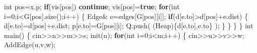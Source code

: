 \documentclass[
]{article}
\newenvironment{Shaded}{}{}
\newcommand{\ControlFlowTok}[1]{\textcolor[rgb]{0.00,0.44,0.13}{\textbf{#1}}}
\newcommand{\DataTypeTok}[1]{\textcolor[rgb]{0.56,0.13,0.00}{#1}}
\newcommand{\DecValTok}[1]{\textcolor[rgb]{0.25,0.63,0.44}{#1}}
\newcommand{\KeywordTok}[1]{\textcolor[rgb]{0.00,0.44,0.13}{\textbf{#1}}}
\newcommand{\NormalTok}[1]{#1}
\newcommand{\OperatorTok}[1]{\textcolor[rgb]{0.40,0.40,0.40}{#1}}
\begin{document}
\begin{Shaded}
\begin{Highlighting}[]
		\DataTypeTok{int}\NormalTok{ pos}\OperatorTok{=}\NormalTok{x}\OperatorTok{.}\NormalTok{p}\OperatorTok{;}
		\ControlFlowTok{if}\OperatorTok{(}\NormalTok{vis}\OperatorTok{[}\NormalTok{pos}\OperatorTok{])} \ControlFlowTok{continue}\OperatorTok{;}
\NormalTok{		vis}\OperatorTok{[}\NormalTok{pos}\OperatorTok{]=}\KeywordTok{true}\OperatorTok{;}
		\ControlFlowTok{for}\OperatorTok{(}\DataTypeTok{int}\NormalTok{ i}\OperatorTok{=}\DecValTok{0}\OperatorTok{;}\NormalTok{i}\OperatorTok{\textless{}}\NormalTok{G}\OperatorTok{[}\NormalTok{pos}\OperatorTok{].}\NormalTok{size}\OperatorTok{();}\NormalTok{i}\OperatorTok{++)} \OperatorTok{\{}
\NormalTok{			Edge}\OperatorTok{\&}\NormalTok{ e}\OperatorTok{=}\NormalTok{edges}\OperatorTok{[}\NormalTok{G}\OperatorTok{[}\NormalTok{pos}\OperatorTok{][}\NormalTok{i}\OperatorTok{]];}
			\ControlFlowTok{if}\OperatorTok{(}\NormalTok{d}\OperatorTok{[}\NormalTok{e}\OperatorTok{.}\NormalTok{to}\OperatorTok{]\textgreater{}}\NormalTok{d}\OperatorTok{[}\NormalTok{pos}\OperatorTok{]+}\NormalTok{e}\OperatorTok{.}\NormalTok{dist}\OperatorTok{)} \OperatorTok{\{}
\NormalTok{				d}\OperatorTok{[}\NormalTok{e}\OperatorTok{.}\NormalTok{to}\OperatorTok{]=}\NormalTok{d}\OperatorTok{[}\NormalTok{pos}\OperatorTok{]+}\NormalTok{e}\OperatorTok{.}\NormalTok{dist}\OperatorTok{;}
\NormalTok{				p}\OperatorTok{[}\NormalTok{e}\OperatorTok{.}\NormalTok{to}\OperatorTok{]=}\NormalTok{G}\OperatorTok{[}\NormalTok{pos}\OperatorTok{][}\NormalTok{i}\OperatorTok{];}
\NormalTok{				Q}\OperatorTok{.}\NormalTok{push}\OperatorTok{(} \OperatorTok{(}\NormalTok{Heap}\OperatorTok{)\{}\NormalTok{d}\OperatorTok{[}\NormalTok{e}\OperatorTok{.}\NormalTok{to}\OperatorTok{],}\NormalTok{e}\OperatorTok{.}\NormalTok{to}\OperatorTok{\}} \OperatorTok{);}
			\OperatorTok{\}}
		\OperatorTok{\}}
	\OperatorTok{\}}
\OperatorTok{\}}
\DataTypeTok{int}\NormalTok{  main}\OperatorTok{()} \OperatorTok{\{}
\NormalTok{	cin}\OperatorTok{\textgreater{}\textgreater{}}\NormalTok{n}\OperatorTok{\textgreater{}\textgreater{}}\NormalTok{m}\OperatorTok{\textgreater{}\textgreater{}}\NormalTok{s}\OperatorTok{;}
\NormalTok{	init}\OperatorTok{(}\NormalTok{n}\OperatorTok{);}
	\ControlFlowTok{for}\OperatorTok{(}\DataTypeTok{int}\NormalTok{ i}\OperatorTok{=}\DecValTok{0}\OperatorTok{;}\NormalTok{i}\OperatorTok{\textless{}}\NormalTok{m}\OperatorTok{;}\NormalTok{i}\OperatorTok{++)} \OperatorTok{\{}
\NormalTok{		cin}\OperatorTok{\textgreater{}\textgreater{}}\NormalTok{u}\OperatorTok{\textgreater{}\textgreater{}}\NormalTok{v}\OperatorTok{\textgreater{}\textgreater{}}\NormalTok{w}\OperatorTok{;}
\NormalTok{		AddEdge}\OperatorTok{(}\NormalTok{u}\OperatorTok{,}\NormalTok{v}\OperatorTok{,}\NormalTok{w}\OperatorTok{);}

\end{Highlighting}
\end{Shaded}
\end{document}
